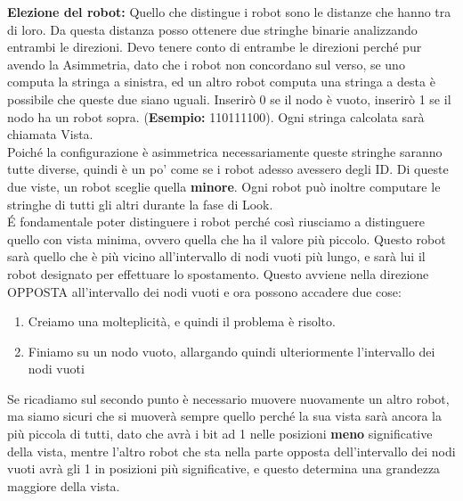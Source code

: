 \textbf{Elezione del robot:} Quello che distingue i robot sono le distanze che
hanno tra di loro. Da questa distanza posso ottenere due stringhe binarie
analizzando entrambi le direzioni. Devo tenere conto di entrambe le direzioni
perché pur avendo la Asimmetria, dato che i robot non concordano sul verso, se
uno computa la stringa a sinistra, ed un altro robot computa una stringa a desta
è possibile che queste due siano uguali. Inserirò 0 se il nodo è vuoto, inserirò
1 se il nodo ha un robot sopra. (\textbf{Esempio:} 110111100). Ogni stringa
calcolata sarà chiamata Vista. \\ Poiché la configurazione è asimmetrica
necessariamente queste stringhe saranno tutte diverse, quindi è un po' come se i
robot adesso avessero degli ID. Di queste due viste, un robot sceglie quella
\textbf{minore}. Ogni robot può inoltre computare le stringhe di tutti gli altri
durante la fase di Look.\\ \'E fondamentale poter distinguere i robot perché
così riusciamo a distinguere quello con vista minima, ovvero quella che ha il
valore più piccolo. Questo robot sarà quello che è più vicino all'intervallo di
nodi vuoti più lungo, e sarà lui il robot designato per effettuare lo
spostamento. Questo avviene nella direzione OPPOSTA all'intervallo dei nodi
vuoti e ora possono accadere due cose:
\begin{enumerate}
    \item Creiamo una molteplicità, e quindi il problema è risolto.
    \item Finiamo su un nodo vuoto, allargando quindi ulteriormente l'intervallo
          dei nodi vuoti
\end{enumerate}
Se ricadiamo sul secondo punto è necessario muovere nuovamente un altro robot,
ma siamo sicuri che si muoverà sempre quello perché la sua vista sarà ancora la
più piccola di tutti, dato che avrà i bit ad 1 nelle posizioni \textbf{meno}
significative della vista, mentre l'altro robot che sta nella parte opposta
dell'intervallo dei nodi vuoti avrà gli 1 in posizioni più significative, e
questo determina una grandezza maggiore della vista.




